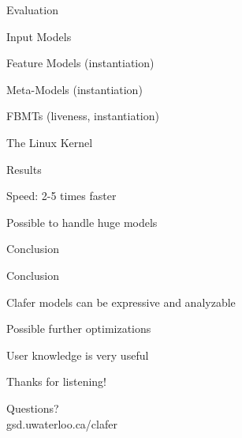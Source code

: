 \documentclass[table,15pt,t]{beamer}
\newcommand{\vmiddle}[1]{
  \vspace{\stretch{1}}
  #1
  \vspace{\stretch{1}}
}
\newcommand{\interframe}[1]{
\begin{frame}{}
\vmiddle{\hmiddle{\Huge #1}}
\end{frame}
}
\newcommand{\mlist}[1]{
\vmiddle{
  \begin{list}{}{}
    #1
  \end{list}
  }
}
\newcommand{\hmiddle}[1]{
  \begin{center}#1\end{center}
}
\newcounter{i}
\begin{document}
\interframe{Evaluation}

\begin{frame}{Input Models}
 \mlist{
    \item Feature Models (instantiation)
    \item Meta-Models (instantiation)
    \item FBMTs (liveness, instantiation)
    \item The Linux Kernel
 }
\end{frame}

\begin{frame}{Results}
 \mlist{
    \item Speed: 2-5 times faster
    \item Possible to handle huge models
 }
\end{frame}

\interframe{Conclusion}

\begin{frame}{Conclusion}
 \mlist{
    \item Clafer models can be expressive and analyzable
    \item Possible further optimizations
    \item User knowledge is very useful
 }
\end{frame}

\interframe{Thanks for listening!}

\interframe{Questions?\\[1cm]\normalsize{\textsf{gsd.uwaterloo.ca/clafer}}}
\end{document}

